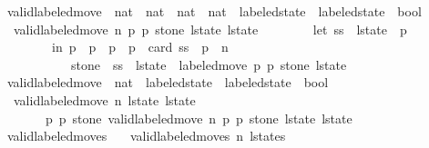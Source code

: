 \begin{isabellebody}
\isanewline
{}\isamarkupfalse%
\ valid{\isacharunderscore}labeled{\isacharunderscore}move{\isacharprime}\ {\isacharcolon}{\isacharcolon}\ {\isachardoublequoteopen}nat\ {\isasymRightarrow}\ nat\ {\isasymRightarrow}\ nat\ {\isasymRightarrow}\ nat\ {\isasymRightarrow}\ labeled{\isacharunderscore}state\ {\isasymRightarrow}\ labeled{\isacharunderscore}state\ {\isasymRightarrow}\ bool{\isachardoublequoteclose}\ \ \isanewline
\ \ {\isachardoublequoteopen}valid{\isacharunderscore}labeled{\isacharunderscore}move{\isacharprime}\ n\ p{}\ p{}\ stone\ l{\isacharunderscore}state\ l{\isacharunderscore}state{\isacharprime}\ {\isasymlongleftrightarrow}\ \isanewline
\ \ \ \ \ \ {\isacharparenleft}let\ ss{}\ {\isacharequal}\ l{\isacharunderscore}state\ {\isacharbang}\ p{}\isanewline
\ \ \ \ \ \ \ \ in\ p{}\ {\isacharless}\ p{}\ {\isasymand}\ p{}\ {\isasymle}\ p{}\ {\isacharplus}\ card\ ss{}\ {\isasymand}\ p{}\ {\isasymle}\ n\ {\isasymand}\isanewline
\ \ \ \ \ \ \ \ \ \ \ stone\ {\isasymin}\ ss{}\ {\isasymand}\ l{\isacharunderscore}state{\isacharprime}\ {\isacharequal}\ labeled{\isacharunderscore}move\ p{}\ p{}\ stone\ l{\isacharunderscore}state{\isacharparenright}{\isachardoublequoteclose}\isanewline
\isanewline
{}\isamarkupfalse%
\ valid{\isacharunderscore}labeled{\isacharunderscore}move\ {\isacharcolon}{\isacharcolon}\ {\isachardoublequoteopen}nat\ {\isasymRightarrow}\ labeled{\isacharunderscore}state\ {\isasymRightarrow}\ labeled{\isacharunderscore}state\ {\isasymRightarrow}\ bool{\isachardoublequoteclose}\ \ \isanewline
\ \ {\isachardoublequoteopen}valid{\isacharunderscore}labeled{\isacharunderscore}move\ n\ l{\isacharunderscore}state\ l{\isacharunderscore}state{\isacharprime}\ {\isasymlongleftrightarrow}\ \isanewline
\ \ \ \ \ \ {\isacharparenleft}{\isasymexists}\ p{}\ p{}\ stone{\isachardot}\ valid{\isacharunderscore}labeled{\isacharunderscore}move{\isacharprime}\ n\ p{}\ p{}\ stone\ l{\isacharunderscore}state\ l{\isacharunderscore}state{\isacharprime}{\isacharparenright}{\isachardoublequoteclose}\isanewline
\isanewline
{}\isamarkupfalse%
\ valid{\isacharunderscore}labeled{\isacharunderscore}moves\ \isanewline
\ \ {\isachardoublequoteopen}valid{\isacharunderscore}labeled{\isacharunderscore}moves\ n\ l{\isacharunderscore}states\ {\isasymlongleftrightarrow}\ \isanewline

\end{isabellebody}
